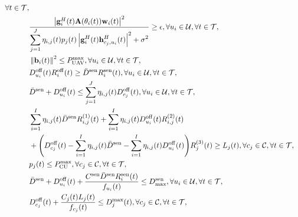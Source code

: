 \documentclass[11pt,a4paper]{ctexart}
\begin{document}
\begin{align}
    \forall t\in\mathcal{T},
    \notag\\
    &
    \frac{
        \left|
            \mathbf{g}_i^H(t)
            \mathbf{A}(\theta_i(t))
            \mathbf{w}_i(t)
        \right|^2
    }{
        \displaystyle
        \sum_{j=1}^{J}
        \eta_{i,j}(t)p_j(t)
        \left|
            \mathbf{g}_i^H(t)
            \mathbf{h}_{c_j,u_i}^H(t)
        \right|^2
        +\sigma^2
    }
    \geq\epsilon,
    \forall u_i\in\mathcal{U},
    \forall t\in\mathcal{T},
    \notag\\
    &
    \left\|\mathbf{b}_i(t)\right\|^2
    \leq P_{\mathrm{UAV}}^{\max},
    \forall u_i\in\mathcal{U},
    \forall t\in\mathcal{T},
    \notag\\
    &
    D_{u_i}^{\mathrm{off}}(t)
    R_i^{\mathrm{off}}(t)
    \geq
    \bar{D}^{\mathrm{sen}}
    R_i^{\mathrm{sen}}(t),
    \forall u_i\in\mathcal{U},
    \forall t\in\mathcal{T},
    \notag\\
    &
    \bar{D}^{\mathrm{sen}}
    +D_{u_i}^{\mathrm{off}}(t)
    \leq
    \sum_{j=1}^{J}
    \eta_{i,j}(t)D_{c_j}^{\mathrm{off}}(t),
    \forall u_i\in\mathcal{U},
    \forall t\in\mathcal{T},
    \notag\\
    &
    \sum_{i=1}^{I}
    \eta_{i,j}(t)
    \bar{D}^{\mathrm{sen}}
    R_{i,j}^{(1)}(t)
    +\sum_{i=1}^{I}
    \eta_{i,j}(t)
    D_{u_i}^{\mathrm{off}}(t)
    R_{i,j}^{(2)}(t)
    \notag\\
    &
    +\Bigg(
        D_{c_j}^{\mathrm{off}}(t)
        -\sum_{i=1}^{I}
        \eta_{i,j}(t)\bar{D}^{\mathrm{sen}}
        -\sum_{i=1}^{I}
        \eta_{i,j}(t)D_{u_i}^{\mathrm{off}}(t)
    \Bigg)
    R_j^{(3)}(t)
    \geq L_j(t),
    \forall c_j\in\mathcal{C},
    \forall t\in\mathcal{T},
    \notag\\
    &
    p_j(t)\leq P_{\mathrm{CU}}^{\max},
    \forall c_j\in\mathcal{C},
    \forall t\in\mathcal{T},
    \notag\\
    &
    \bar{D}^{\mathrm{sen}}
    +D_{u_i}^{\mathrm{off}}(t)
    +\frac{
        C^{\mathrm{sen}}
        \bar{D}^{\mathrm{sen}}
        R_i^{\mathrm{sen}}(t)
    }{
        f_{u_i}(t)
    }
    \leq D_{\max}^{\mathrm{sen}},
    \forall u_i\in\mathcal{U},
    \forall t\in\mathcal{T},
    \notag\\
    &
    D_{c_j}^{\mathrm{off}}(t)
    +\frac{
        C_j(t)L_j(t)
    }{
        f_{c_j}(t)
    }
    \leq D_j^{\max}(t),
    \forall c_j\in\mathcal{C},
    \forall t\in\mathcal{T},
    \notag\\

\end{align}
\end{document}
